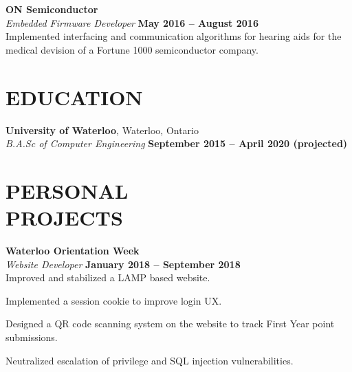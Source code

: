 \documentclass[margin,line]{resume}
\begin{document}
\begin{resume}
\vspace{1mm}
\textbf{\listing ON Semiconductor} \vspace{2mm}\\\vspace{1mm}%
\textsl{Embedded Firmware Developer} \hfill \textbf{May 2016 -- August 2016}\\
Implemented interfacing and communication algorithms for hearing aids for the medical devision of a Fortune 1000 semiconductor company.


\vspace{-1mm}
\sectionline

    \section{\mysidestyle \textbf{\large{E}\small{DUCATION}}}

    \textbf{\listing University of Waterloo}, Waterloo, Ontario\vspace{1mm}\\
    \textsl{B.A.Sc of Computer Engineering} \hfill \textbf{September 2015 -- April 2020 (projected)}\vspace{-3mm}\\\vspace{-1mm}%

\sectionline

    \section{\mysidestyle \textbf{\large{P}\small{ERSONAL}\\ \large{P}\small{ROJECTS}}}

    \textbf{\listing Waterloo Orientation Week} \vspace{2mm}\\%
    \textsl{Website Developer} \hfill \textbf{January 2018 -- September 2018}\\
    Improved and stabilized a LAMP based website. \\
    \begin{tightemize}
    \item Implemented a session cookie to improve login UX.
    \item Designed a QR code scanning system on the website to track First Year point submissions.
    \item Neutralized escalation of privilege and SQL injection vulnerabilities.
    \end{tightemize}


\end{resume}
\end{document}
